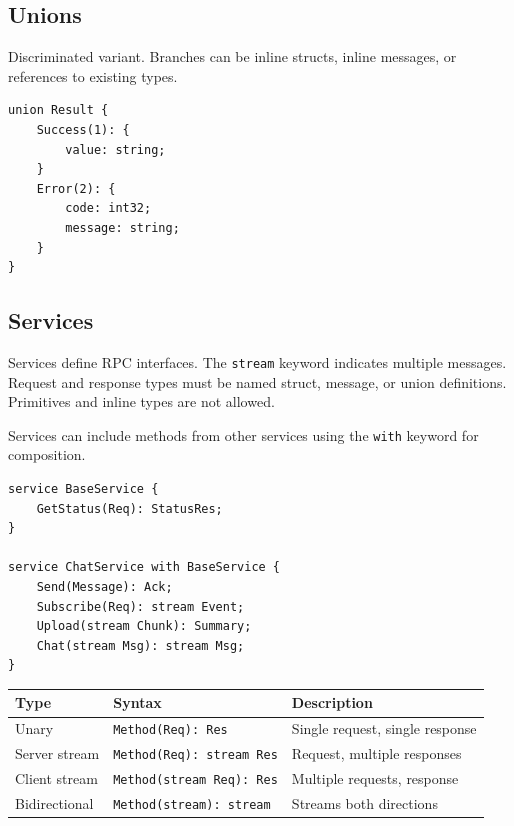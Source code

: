 \documentclass[11pt,onecolumn]{article}
\begin{document}
\subsection{Unions}

\begin{minipage}[t]{0.52\textwidth}
Discriminated variant. Branches can be inline structs, inline messages, or references to existing types.
\end{minipage}\hfill
\begin{minipage}[t]{0.44\textwidth}
\begin{lstlisting}[language=bebop,aboveskip=0pt,belowskip=0pt]
union Result {
    Success(1): {
        value: string;
    }
    Error(2): {
        code: int32;
        message: string;
    }
}
\end{lstlisting}
\end{minipage}


\subsection{Services}

\begin{minipage}{\textwidth}
\begin{minipage}[t]{0.48\textwidth}
\raggedright
Services define RPC interfaces. The \texttt{stream} keyword indicates multiple messages. Request and response types must be named struct, message, or union definitions. Primitives and inline types are not allowed.

Services can include methods from other services using the \texttt{with} keyword for composition.
\end{minipage}\hfill
\begin{minipage}[t]{0.48\textwidth}
\begin{lstlisting}[language=bebop,aboveskip=0pt,belowskip=0pt]
service BaseService {
    GetStatus(Req): StatusRes;
}

service ChatService with BaseService {
    Send(Message): Ack;
    Subscribe(Req): stream Event;
    Upload(stream Chunk): Summary;
    Chat(stream Msg): stream Msg;
}
\end{lstlisting}
\end{minipage}
\end{minipage}

\begin{minipage}{\textwidth}
\small
\begin{tabular}{@{}llp{2in}@{}}
\toprule
\textbf{Type} & \textbf{Syntax} & \textbf{Description} \\
\midrule
Unary & \texttt{Method(Req): Res} & Single request, single response \\
Server stream & \texttt{Method(Req): stream Res} & Request, multiple responses \\
Client stream & \texttt{Method(stream Req): Res} & Multiple requests, response \\
Bidirectional & \texttt{Method(stream): stream} & Streams both directions \\
\bottomrule
\end{tabular}
\end{minipage}
\end{document}

